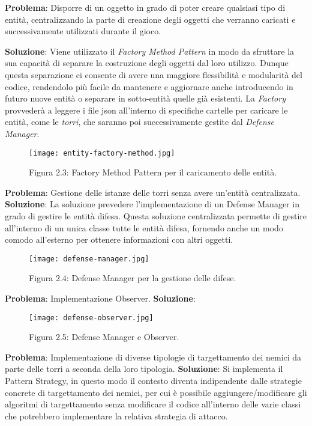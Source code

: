 \documentclass[a4paper,12pt]{report}
\begin{document}
\textbf{Problema}:
Disporre di un oggetto in grado di poter creare qualsiasi tipo di entità, centralizzando la parte di creazione degli oggetti che verranno caricati e successivamente utilizzati
durante il gioco.

\textbf{Soluzione}:
Viene utilizzato il \textit{Factory Method Pattern} in modo da sfruttare la sua capacità di separare la costruzione degli oggetti dal loro utilizzo. Dunque questa separazione ci consente di avere una maggiore flessibilità e modularità del codice, rendendolo più facile da mantenere e aggiornare anche introducendo in futuro nuove entità o separare in sotto-entità quelle già esistenti. 
La \textit{Factory} provvederà a leggere i file json all'interno di specifiche cartelle per caricare
le entità, come le \textit{torri}, che saranno poi successivamente gestite dal \textit{Defense Manager}.
\begin{figure}[H]
    \centering
    \texttt{[image: entity-factory-method.jpg]}
    \caption{Figura 2.3: Factory Method Pattern per il caricamento delle entità.}
    \label{fig:entity-factory-method}
\end{figure}

\textbf{Problema}:
Gestione delle istanze delle torri senza avere un'entità centralizzata.
\textbf{Soluzione}:
La soluzione prevedere l'implementazione di un Defense Manager in grado di gestire le entità difesa. Questa soluzione centralizzata permette di gestire all'interno di un unica classe tutte le entità difesa, fornendo anche un modo comodo all'esterno per ottenere informazioni con altri oggetti.

\begin{figure}[H]
    \centering
    \texttt{[image: defense-manager.jpg]}
    \caption{Figura 2.4: Defense Manager per la gestione delle difese.}
    \label{fig:defense-manager}
\end{figure}


\textbf{Problema}:
Implementazione Observer.
\textbf{Soluzione}:


\begin{figure}[H]
    \centering
    \texttt{[image: defense-observer.jpg]}
    \caption{Figura 2.5: Defense Manager e Observer.}
    \label{fig:defense-observer}
\end{figure}

\textbf{Problema}:
Implementazione di diverse tipologie di targettamento dei nemici da parte delle torri a seconda della loro tipologia.
\textbf{Soluzione}:
Si implementa il Pattern Strategy, in questo modo il contesto diventa indipendente dalle strategie concrete di targettamento dei nemici, per cui è possibile aggiungere/modificare gli algoritmi di targettamento senza modificare il codice all'interno delle varie classi che potrebbero implementare la relativa strategia di attacco.
\end{document}
